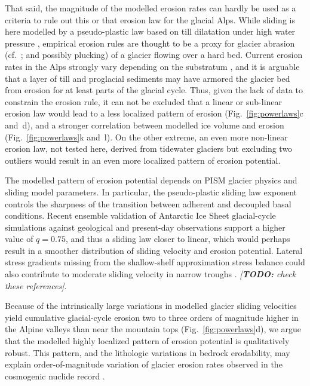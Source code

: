 \documentclass[esurf, manuscript]{copernicus}
\newcommand{\todo}[1]{\textcolor{Rd}{\emph{[\textbf{TODO:} #1]}}}
\begin{document}
    That said, the magnitude of the modelled erosion rates can hardly be used
    as a criteria to rule out this or that erosion law for the glacial Alps.
    While sliding is here modelled by a pseudo-plastic law based on
    till dilatation under high water pressure \citep{Tulaczyk.etal.2000},
    empirical erosion rules are thought to be a proxy for glacier abrasion
    (cf.~\citealp{Hallet.1979}; and possibly plucking) of a glacier flowing
    over a hard bed. Current erosion rates in the Alps strongly vary depending
    on the substratum \citep{Steinemann.etal.2020, Steinemann.etal.2021}, and
    it is arguable that a layer of till and proglacial sediments may have
    armored the glacier bed from erosion for at least parts of the glacial
    cycle. Thus, given the lack of data to constrain the erosion rule, it can
    not be excluded that a linear or sub-linear erosion law
    \citep[e.g.,][]{Cook.etal.2020} would lead to a less localized pattern of
    erosion (Fig.~\ref{fig:powerlaws}c and~d), and a stronger correlation
    between modelled ice volume and erosion (Fig.~\ref{fig:powerlaws}k and~l).
    On the other extreme, an even more non-linear erosion law, not tested here,
    derived from tidewater glaciers but excluding two outliers
    \citep[${\dot{e}=5.3\times10^{-9}u_\mathrm{b}^{2.62}}$,][]{Koppes.etal.2015}
    would result in an even more localized pattern of erosion potential.

    The modelled pattern of erosion potential depends on PISM glacier physics
    and sliding model parameters. In particular, the pseudo-plastic sliding law
    exponent \citep[$q=0.25$ in][]{Seguinot.etal.2018} controls the sharpness
    of the transition between adherent and decoupled basal conditions. Recent
    ensemble validation of Antarctic Ice Sheet glacial-cycle simulations
    against geological and present-day observations \citep{Albrecht.etal.2020,
    Albrecht.etal.2020a} support a higher value of $q=0.75$, and thus a
    sliding law closer to linear, which would perhaps result in a smoother
    distribution of sliding velocity and erosion potential. Lateral stress
    gradients missing from the shallow-shelf approximation stress balance could
    also contribute to moderate sliding velocity in narrow troughs
    \citep{Herman.etal.2011, Egholm.etal.2012, Egholm.etal.2012a,
    Pedersen.etal.2014}. \todo{check these references}.

    Because of the intrinsically large variations in modelled glacier sliding
    velocities yield cumulative glacial-cycle erosion two to three orders of
    magnitude higher in the Alpine valleys than near the mountain tops
    (Fig.~\ref{fig:powerlaws}d), we argue that the modelled highly localized
    pattern of erosion potential is qualitatively robust. This pattern, and
    the lithologic variations in bedrock erodability, may explain
    order-of-magnitude variation of glacier erosion rates observed in the
    cosmogenic nuclide record \citep{Jansen.etal.2019, Steinemann.etal.2020,
    Steinemann.etal.2021}.
\end{document}
